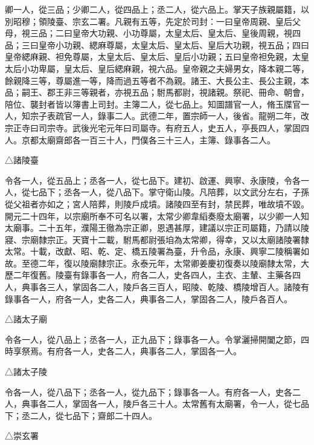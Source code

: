 \begin{pinyinscope}
 卿一人，從三品；少卿二人，從四品上；丞二人，從六品上。掌天子族親屬籍，以別昭穆；領陵臺、宗玄二署。凡親有五等，先定於司封：一曰皇帝周親、皇后父母，視三品；二曰皇帝大功親、小功尊屬，太皇太后、皇太后、皇後周親，視四品；三曰皇帝小功親、緦麻尊屬，太皇太后、皇太后、皇后大功親，視五品；四曰皇帝緦麻親、袒免尊屬，太皇太后、皇太后、皇后小功親；五曰皇帝袒免親，太皇太后小功卑屬，皇太后、皇后緦麻親，視六品。皇帝親之夫婦男女，降本親二等，餘親降三等，尊屬進一等，降而過五等者不為親。諸王、大長公主、長公主親，本品；嗣王、郡王非三等親者，亦視五品；駙馬都尉，視諸親。祭祀、冊命、朝會，陪位、襲封者皆以簿書上司封。主簿二人，從七品上。知圖譜官一人，脩玉牒官一人，知宗子表疏官一人，錄事二人。武德二年，置宗師一人，後省。龍朔二年，改宗正寺曰司宗寺。武後光宅元年曰司屬寺。有府五人，史五人，亭長四人，掌固四人。京都太廟齋郎各一百三十人，門僕各三十三人，主簿、錄事各二人。



 △諸陵臺



 令各一人，從五品上；丞各一人，從七品下。建初、啟運、興寧、永康陵，令各一人，從七品下；丞各一人，從八品下。掌守衛山陵。凡陪葬，以文武分左右，子孫從父祖者亦如之；宮人陪葬，則陵戶成墳。諸陵四至有封，禁民葬，唯故墳不毀。開元二十四年，以宗廟所奉不可名以署，太常少卿韋縚奏廢太廟署，以少卿一人知太廟事。二十五年，濮陽王徹為宗正卿，恩遇甚厚，建議以宗正司屬籍，乃請以陵寢、宗廟隸宗正。天寶十二載，駙馬都尉張垍為太常卿，得幸，又以太廟諸陵署隸太常。十載，改獻、昭、乾、定、橋五陵署為臺，升令品，永康、興寧二陵稱署如故。至德二年，復以陵廟隸宗正。永泰元年，太常卿姜慶初復奏以陵廟隸太常，大歷二年復舊。陵臺有錄事各一人，府各二人，史各四人，主衣、主輦、主藥各四人，典事各三人，掌固各二人，陵戶各三百人，昭陵、乾陵、橋陵增百人。諸陵有錄事各一人，府各一人，史各二人，典事各二人，掌固各二人，陵戶各百人。



 △諸太子廟



 令各一人，從八品上；丞各一人，正九品下；錄事各一人。令掌灑掃開闔之節，四時享祭焉。有府各一人，史各二人，典事各二人，掌固各一人。



 △諸太子陵



 令各一人，從八品下；丞各一人，從九品下；錄事各一人。有府各一人，史各二人，典事各二人，掌固各一人，陵戶各三十人。太常舊有太廟署，令一人，從七品下；丞二人，從七品下；齋郎二十四人。



 △崇玄署




\end{pinyinscope}
